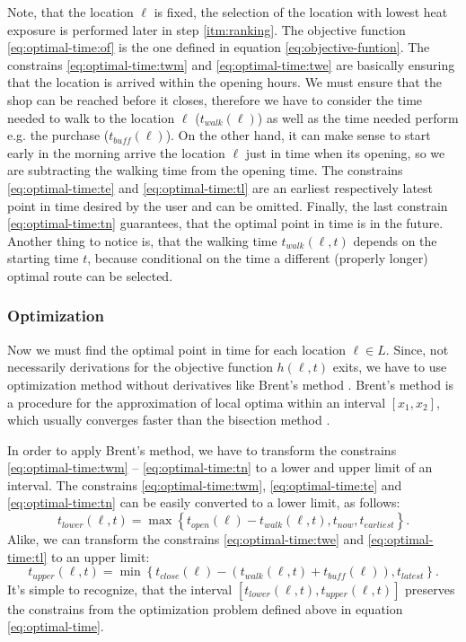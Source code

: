 Note, that the location $\ell$ is fixed, the selection of the location with lowest heat exposure is performed later in step \ref{itm:ranking}.  The objective function \eqref{eq:optimal-time:of} is the one defined in equation \eqref{eq:objective-funtion}. The constrains \eqref{eq:optimal-time:twm} and \eqref{eq:optimal-time:twe} are  basically ensuring that the location is arrived within the opening hours. We must ensure that the shop can be reached before it closes, therefore we have to consider the time needed to walk to the location $\ell$ ($t_{walk}(\ell)$) as well as the time needed perform e.g. the purchase ($t_{buff}(\ell)$). On the other hand, it can make sense to start early in the morning  arrive the location $\ell$ just in time when its opening, so we are subtracting the walking time from the opening time. The constrains \eqref{eq:optimal-time:te} and \eqref{eq:optimal-time:tl} are an earliest respectively latest point in time desired by the user and can be omitted. Finally, the last constrain  \eqref{eq:optimal-time:tn}  guarantees, that the optimal point in time is in the future. Another thing to notice is, that the walking time $t_{walk}(\ell, t)$ depends on the starting time $t$, because conditional on the time a different (properly longer) optimal route can be selected.

 \subsubsection{Optimization}
 
 Now we must find the optimal point in time for each location $\ell \in L$. Since, not necessarily derivations for the objective function $h(\ell, t)$ exits, we have to use optimization method without derivatives like Brent's method \parencite{Brent2002}. Brent's  method is a procedure for the approximation of local optima within an interval $[x_1, x_2]$, which usually converges faster than the bisection method \parencite{Press1992}.
 
 In order to apply Brent's method, we have to transform the constrains \eqref{eq:optimal-time:twm} -- \eqref{eq:optimal-time:tn} to a lower and upper limit of an interval.  The constrains \eqref{eq:optimal-time:twm}, \eqref{eq:optimal-time:te} and \eqref{eq:optimal-time:tn} can  be easily converted to a lower limit, as follows: 
  	\begin{equation}\label{eq:lower-limit}
  		t_{lower}(\ell, t) = \max\left\lbrace  t_{open}(\ell)-t_{walk}(\ell, t), t_{now}, t_{earliest} \right\rbrace.
  	\end{equation}
  Alike, we can transform the constrains \eqref{eq:optimal-time:twe} and \eqref{eq:optimal-time:tl} to an upper limit:
  	\begin{equation}\label{eq:upper-limit}
  		t_{upper}(\ell, t) = \min\left\lbrace  t_{close}(\ell)- (t_{walk}(\ell, t) + t_{buff}(\ell)), t_{latest} \right\rbrace.
  	\end{equation}
 It's simple to recognize, that the interval $[t_{lower}(\ell, t), t_{upper}(\ell, t)]$ preserves the constrains from the optimization problem defined above in equation \eqref{eq:optimal-time}.  
 
